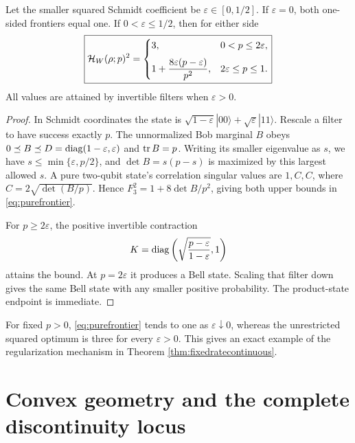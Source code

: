 \begin{theorem}\label{thm:purefrontier}
Let the smaller squared Schmidt coefficient be $\varepsilon\in[0,1/2]$.
If $\varepsilon=0$, both one-sided frontiers equal one. If
$0<\varepsilon\leq1/2$, then for either side
\begin{equation}\label{eq:purefrontier}\boxed{
 \mathcal H_W(\rho;p)^2=
 \begin{cases}
 3,&0<p\leq2\varepsilon,\\[2mm]
 1+\dfrac{8\varepsilon(p-\varepsilon)}{p^2},&2\varepsilon\leq p\leq1.
 \end{cases}}
\end{equation}
All values are attained by invertible filters when $\varepsilon>0$.
\end{theorem}
\begin{proof}
In Schmidt coordinates the state is
$\sqrt{1-\varepsilon}|00\rangle+\sqrt\varepsilon|11\rangle$.
Rescale a filter to have success exactly $p$. The unnormalized Bob
marginal $B$ obeys
$0\preceq B\preceq D=\operatorname{diag}(1-\varepsilon,\varepsilon)$ and $\operatorname{tr} B=p$.
Writing its smaller eigenvalue as $s$, we have
$s\leq\min\{\varepsilon,p/2\}$, and
$\det B=s(p-s)$ is maximized by this largest allowed $s$.
A pure two-qubit state's correlation singular values are
$1,C,C$, where $C=2\sqrt{\det(B/p)}$. Hence
$F_3^2=1+8\det B/p^2$, giving both upper bounds in
\eqref{eq:purefrontier}.

For $p\geq2\varepsilon$, the positive invertible contraction
\[
 K=\operatorname{diag}\left(\sqrt{\frac{p-\varepsilon}{1-\varepsilon}},1\right)
\]
attains the bound. At $p=2\varepsilon$ it produces a Bell state.
Scaling that filter down gives the same Bell state with any smaller
positive probability. The product-state endpoint is immediate.
\end{proof}

For fixed $p>0$, \eqref{eq:purefrontier} tends to one as
$\varepsilon\downarrow0$, whereas the unrestricted squared optimum is
three for every $\varepsilon>0$. This gives an exact example of the
regularization mechanism in Theorem \ref{thm:fixedratecontinuous}.

\section{Convex geometry and the complete discontinuity locus}

